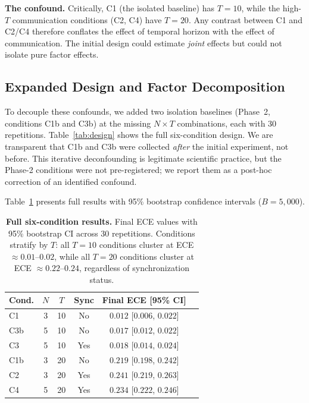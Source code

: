 \documentclass[11pt]{article}
\begin{document}
\textbf{The confound.} Critically, C1 (the isolated baseline) has $T{=}10$, while the high-$T$ communication conditions (C2, C4) have $T{=}20$. Any contrast between C1 and C2/C4 therefore conflates the effect of temporal horizon with the effect of communication. The initial design could estimate \emph{joint} effects but could not isolate pure factor effects.

\subsection{Expanded Design and Factor Decomposition}

To decouple these confounds, we added two isolation baselines (Phase~2, conditions C1b and C3b) at the missing $N{\times}T$ combinations, each with 30 repetitions. Table~\ref{tab:design} shows the full six-condition design. We are transparent that C1b and C3b were collected \emph{after} the initial experiment, not before. This iterative deconfounding is legitimate scientific practice, but the Phase-2 conditions were not pre-registered; we report them as a post-hoc correction of an identified confound.

Table~\ref{tab:results} presents full results with 95\% bootstrap confidence intervals ($B{=}5{,}000$).

\begin{table}[t]
\centering
\caption{\textbf{Full six-condition results.} Final ECE values with 95\% bootstrap CI across 30 repetitions. Conditions stratify by $T$: all $T{=}10$ conditions cluster at ECE $\approx 0.01$--$0.02$, while all $T{=}20$ conditions cluster at ECE $\approx 0.22$--$0.24$, regardless of synchronization status.}
\label{tab:results}
\begin{tabular}{lccccc}
\toprule
Cond. & $N$ & $T$ & Sync & Final ECE [95\% CI] \\
\midrule
C1  & 3 & 10 & No  & $0.012$ [$0.006$, $0.022$] \\
C3b & 5 & 10 & No  & $0.017$ [$0.012$, $0.022$] \\
C3  & 5 & 10 & Yes & $0.018$ [$0.014$, $0.024$] \\
\midrule
C1b & 3 & 20 & No  & $0.219$ [$0.198$, $0.242$] \\
C2  & 3 & 20 & Yes & $0.241$ [$0.219$, $0.263$] \\
C4  & 5 & 20 & Yes & $0.234$ [$0.222$, $0.246$] \\
\bottomrule
\end{tabular}
\end{table}
\end{document}

